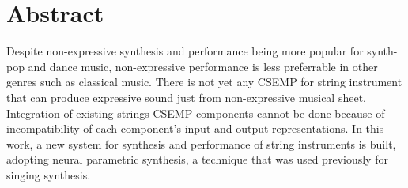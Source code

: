 \clearpage
\chapter*{Abstract}

Despite non-expressive synthesis and performance being more popular for synth-pop and dance music, non-expressive performance is less preferrable in other genres such as classical music. There is not yet any CSEMP for string instrument that can produce expressive sound just from non-expressive musical sheet. Integration of existing strings CSEMP components cannot be done because of incompatibility of each component's input and output representations. In this work, a new system for synthesis and performance of string instruments is built, adopting neural parametric synthesis, a technique that was used previously for singing synthesis.

\clearpage